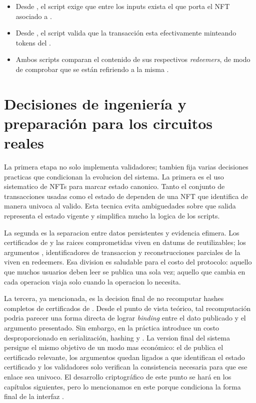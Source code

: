 \begin{itemize}[noitemsep]
	\item Desde \MintingValidator, el script exige que entre los inputs exista el \UTxO que porta el NFT asociado a \TxsUpdaterMintingValidator.
	\item Desde \TxsUpdaterMintingValidator, el script valida que la transacción esta efectivamente minteando tokens del \zkBridge.
	\item Ambos scripts comparan el contenido de sus respectivos \textit{redeemers}, de modo de comprobar que se están refiriendo a la misma \LockTx.
\end{itemize}

\section{Decisiones de ingeniería y preparación para los circuitos reales}

La primera etapa no solo implementa validadores; tambien fija varias decisiones practicas que condicionan la evolucion del sistema. La primera es el uso sistematico de NFTs para marcar estado canonico. Tanto el conjunto de transacciones usadas como el estado de \StakeDistribution dependen de una NFT que identifica de manera univoca al \UTxO valido. Esta tecnica evita ambiguedades sobre que salida representa el estado vigente y simplifica mucho la logica de los scripts.

La segunda es la separacion entre datos persistentes y evidencia efimera. Los certificados de \Mithril y las raices comprometidas viven en datums de \UTxOs reutilizables; los argumentos \ZK, identificadores de transaccion y reconstrucciones parciales de la \LockTx viven en redeemers. Esa division es saludable para el costo del protocolo: aquello que muchos usuarios deben leer se publica una sola vez; aquello que cambia en cada operacion viaja solo cuando la operacion lo necesita.

La tercera, ya mencionada, es la decision final de no recomputar \Onchain hashes completos de certificados de \Mithril. Desde el punto de vista teórico, tal recomputación podria parecer una forma directa de lograr \textit{binding} entre el dato publicado y el argumento \ZK presentado. Sin embargo, en la práctica introduce un costo desproporcionado en serialización, hashing y \ExUnits. La version final del sistema persigue el mismo objetivo de un modo mas económico: el \UTxO de \StakeDistribution publica el certificado relevante, los argumentos quedan ligados a \PublicInputs que identifican el estado certificado y los validadores solo verifican la consistencia necesaria para que ese enlace sea univoco. El desarrollo criptográfico de este punto se hará en los capítulos siguientes, pero lo mencionamos en este porque condiciona la forma final de la interfaz \Onchain.

